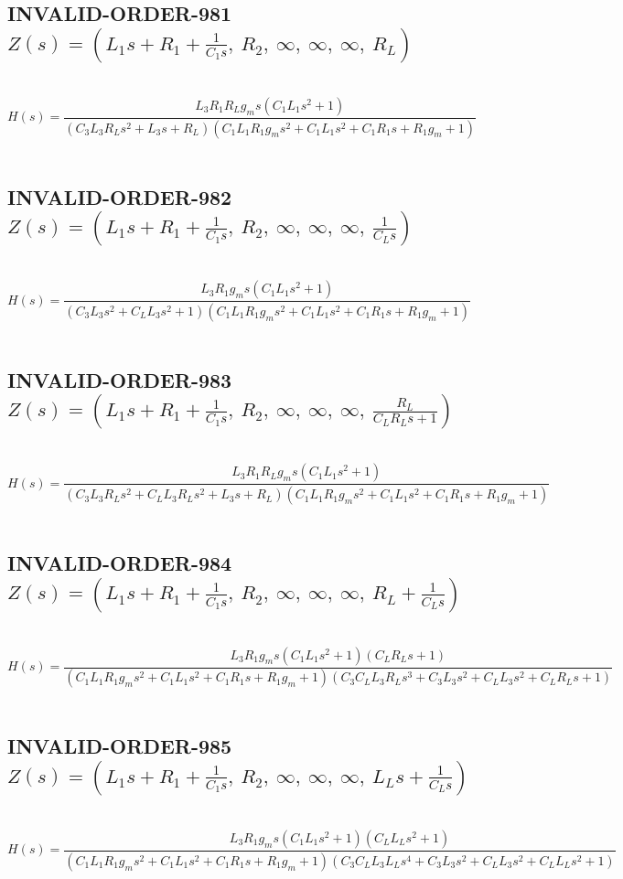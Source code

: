 \documentclass{article}
\begin{document}
\subsection{INVALID-ORDER-981 $Z(s) = \left( L_{1} s + R_{1} + \frac{1}{C_{1} s}, \  R_{2}, \  \infty, \  \infty, \  \infty, \  R_{L}\right)$ } \ 
\textbf{\[H(s) = \frac{L_{3} R_{1} R_{L} g_{m} s \left(C_{1} L_{1} s^{2} + 1\right)}{\left(C_{3} L_{3} R_{L} s^{2} + L_{3} s + R_{L}\right) \left(C_{1} L_{1} R_{1} g_{m} s^{2} + C_{1} L_{1} s^{2} + C_{1} R_{1} s + R_{1} g_{m} + 1\right)}\] } \ 
\subsection{INVALID-ORDER-982 $Z(s) = \left( L_{1} s + R_{1} + \frac{1}{C_{1} s}, \  R_{2}, \  \infty, \  \infty, \  \infty, \  \frac{1}{C_{L} s}\right)$ } \ 
\textbf{\[H(s) = \frac{L_{3} R_{1} g_{m} s \left(C_{1} L_{1} s^{2} + 1\right)}{\left(C_{3} L_{3} s^{2} + C_{L} L_{3} s^{2} + 1\right) \left(C_{1} L_{1} R_{1} g_{m} s^{2} + C_{1} L_{1} s^{2} + C_{1} R_{1} s + R_{1} g_{m} + 1\right)}\] } \ 
\subsection{INVALID-ORDER-983 $Z(s) = \left( L_{1} s + R_{1} + \frac{1}{C_{1} s}, \  R_{2}, \  \infty, \  \infty, \  \infty, \  \frac{R_{L}}{C_{L} R_{L} s + 1}\right)$ } \ 
\textbf{\[H(s) = \frac{L_{3} R_{1} R_{L} g_{m} s \left(C_{1} L_{1} s^{2} + 1\right)}{\left(C_{3} L_{3} R_{L} s^{2} + C_{L} L_{3} R_{L} s^{2} + L_{3} s + R_{L}\right) \left(C_{1} L_{1} R_{1} g_{m} s^{2} + C_{1} L_{1} s^{2} + C_{1} R_{1} s + R_{1} g_{m} + 1\right)}\] } \ 
\subsection{INVALID-ORDER-984 $Z(s) = \left( L_{1} s + R_{1} + \frac{1}{C_{1} s}, \  R_{2}, \  \infty, \  \infty, \  \infty, \  R_{L} + \frac{1}{C_{L} s}\right)$ } \ 
\textbf{\[H(s) = \frac{L_{3} R_{1} g_{m} s \left(C_{1} L_{1} s^{2} + 1\right) \left(C_{L} R_{L} s + 1\right)}{\left(C_{1} L_{1} R_{1} g_{m} s^{2} + C_{1} L_{1} s^{2} + C_{1} R_{1} s + R_{1} g_{m} + 1\right) \left(C_{3} C_{L} L_{3} R_{L} s^{3} + C_{3} L_{3} s^{2} + C_{L} L_{3} s^{2} + C_{L} R_{L} s + 1\right)}\] } \ 
\subsection{INVALID-ORDER-985 $Z(s) = \left( L_{1} s + R_{1} + \frac{1}{C_{1} s}, \  R_{2}, \  \infty, \  \infty, \  \infty, \  L_{L} s + \frac{1}{C_{L} s}\right)$ } \ 
\textbf{\[H(s) = \frac{L_{3} R_{1} g_{m} s \left(C_{1} L_{1} s^{2} + 1\right) \left(C_{L} L_{L} s^{2} + 1\right)}{\left(C_{1} L_{1} R_{1} g_{m} s^{2} + C_{1} L_{1} s^{2} + C_{1} R_{1} s + R_{1} g_{m} + 1\right) \left(C_{3} C_{L} L_{3} L_{L} s^{4} + C_{3} L_{3} s^{2} + C_{L} L_{3} s^{2} + C_{L} L_{L} s^{2} + 1\right)}\] } \ 
\end{document}
